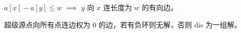 $ a[x] - a[y] \leq w$ $\implies$ $y$ 向 $x$ 连长度为 $w$ 的有向边。

超级源点向所有点连边权为 $0$ 的边，若有负环则无解，否则 dis 为一组解。
